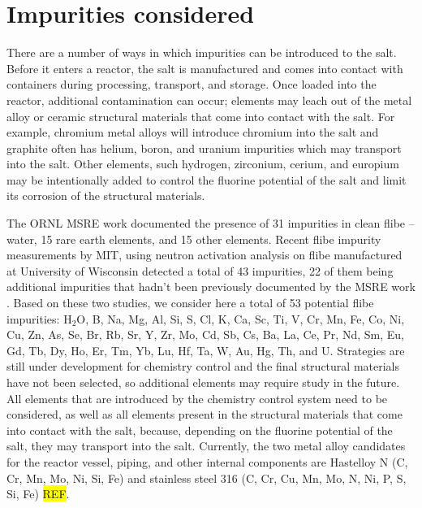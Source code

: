 \documentclass[11pt]{article}
\newcommand{\REF}[0]{\colorbox{yellow}{REF}}
\newcommand{\water}[0]{$\mathrm{H_2O}$}
\begin{document}
\section{Impurities considered}
\label{sec:impurities}

There are a number of ways in which impurities can be introduced to the salt.
Before it enters a reactor, the salt is manufactured and comes into contact with containers during processing, transport, and storage.
Once loaded into the reactor, additional contamination can occur; elements may leach out of the metal alloy or ceramic structural materials that come into contact with the salt.
For example, chromium metal alloys will introduce chromium into the salt and graphite often has helium, boron, and uranium impurities which may transport into the salt.
Other elements, such hydrogen, zirconium, cerium, and europium may be intentionally added to control the fluorine potential of the salt and limit its corrosion of the structural materials.

The ORNL MSRE work \cite{shaffer1971phs} documented the presence of 31 impurities in clean flibe -- water, 15 rare earth elements, and 15 other elements.
Recent flibe impurity measurements by MIT, using neutron activation analysis on flibe manufactured at University of Wisconsin detected a total of 43 impurities, 22 of them being additional impurities that hadn't been previously documented by the MSRE work \cite{ames2013tea}.
Based on these two studies, we consider here a total of 53 potential flibe impurities: \water{}, B, Na, Mg, Al, Si, S, Cl, K, Ca, Sc, Ti, V, Cr, Mn, Fe, Co, Ni, Cu, Zn, As, Se, Br, Rb, Sr, Y, Zr, Mo, Cd, Sb, Cs, Ba, La, Ce, Pr, Nd, Sm, Eu, Gd, Tb, Dy, Ho, Er, Tm, Yb, Lu, Hf, Ta, W, Au, Hg, Th, and U.
Strategies are still under development for chemistry control and the final structural materials have not been selected, so additional elements may require study in the future.
All elements that are introduced by the chemistry control system need to be considered, as well as all elements present in the structural materials that come into contact with the salt, because, depending on the fluorine potential of the salt, they may transport into the salt.
Currently, the two metal alloy candidates for the reactor vessel, piping, and other internal components are Hastelloy N (C, Cr, Mn, Mo, Ni, Si, Fe) and stainless steel 316 (C, Cr, Cu, Mn, Mo, N, Ni, P, S, Si, Fe) \REF.
\end{document}
